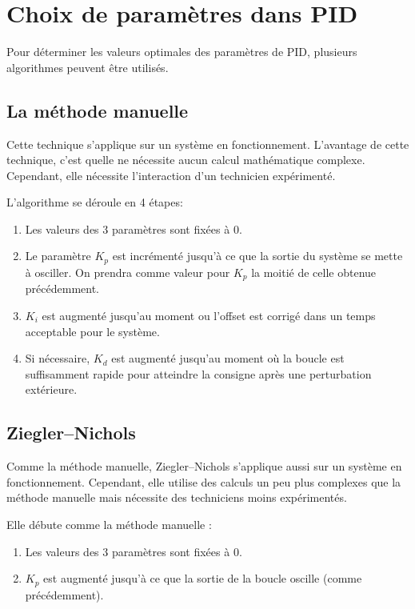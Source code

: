 \section{Choix de paramètres dans PID}

Pour déterminer les valeurs optimales des paramètres de PID, plusieurs algorithmes peuvent être utilisés.

\subsection{La méthode manuelle}
Cette technique s'applique sur un système en fonctionnement.
L'avantage de cette technique, c'est quelle ne nécessite aucun calcul mathématique complexe.
Cependant, elle nécessite l'interaction d'un technicien expérimenté.

L'algorithme se déroule en 4 étapes:
\begin{enumerate}
	\item Les valeurs des 3 paramètres sont fixées à $0$.
	\item Le paramètre $K_p$ est incrémenté jusqu'à ce que la sortie du système se mette à osciller.
	On prendra comme valeur pour $K_p$ la moitié de celle obtenue précédemment.
	\item $K_i$ est augmenté jusqu'au moment ou l'offset est corrigé dans un temps acceptable pour le système.
	\item Si nécessaire, $K_d$ est augmenté jusqu'au moment où la boucle est suffisamment rapide pour atteindre la consigne après une perturbation extérieure.
\end{enumerate}

\subsection{Ziegler–Nichols}
Comme la méthode manuelle, Ziegler–Nichols s'applique aussi sur un système en fonctionnement. Cependant, elle utilise des calculs un peu plus complexes que la méthode manuelle mais nécessite des techniciens moins expérimentés.

Elle débute comme la méthode manuelle :
\begin{enumerate}
	\item Les valeurs des 3 paramètres sont fixées à $0$.
	\item $K_p$ est augmenté jusqu'à ce que la sortie de la boucle oscille (comme précédemment).
\end{enumerate}

